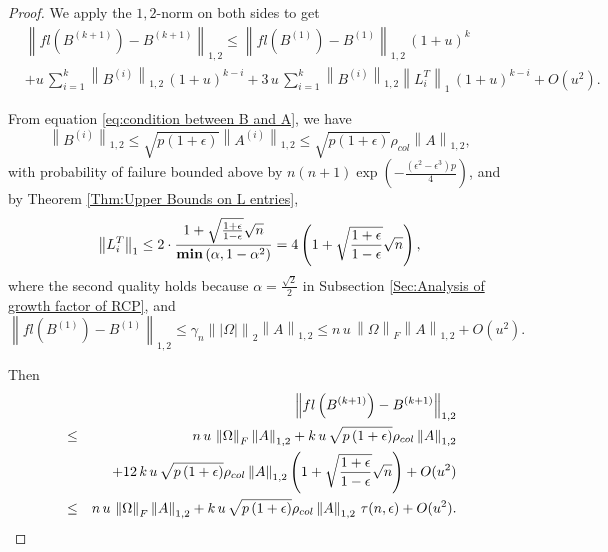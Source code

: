 \documentclass[11pt]{article}
\begin{document}
\begin{proof}
We apply the $1,2$-norm on both sides to get
\begin{align*}
    &\left\| fl\left(B^{(k+1)}\right)  - B^{(k+1)} \right\|_{1,2} \le \left\| fl \left(B^{(1)} \right)  - B^{(1)} \right\|_{1,2} \, (1+u)^{k} \\
& + u \, \sum_{i=1}^{k} \left\| B^{(i)} \right\|_{1,2} \, (1+u)^{k-i} + 3 \, u \, \sum_{i = 1}^{k} \left\| B^{(i)} \right\|_{1,2} \left\| L_i^T \right\|_1 \, (1+u)^{k-i} + O(u^2).
\end{align*}

From equation \eqref{eq:condition between B and A}, we have 
\begin{equation*}
\left\|B^{(i)}\right\|_{1,2} \le \sqrt{p(1+\epsilon)} \left\|A^{(i)}\right\|_{1,2} \le \sqrt{p(1+\epsilon)}
\rho_{col}\left\|A\right\|_{1,2},
\end{equation*}
with probability of failure bounded above by $n(n+1) \exp{\left( -\frac{(\epsilon^2-\epsilon^3) p}{4} \right)}$, and by Theorem \ref{Thm:Upper Bounds on L entries},
\begin{equation*}
\left\|L_i^T\right\|_1 \le 2 \cdot \frac{1+\sqrt{\frac{1+\epsilon}{1-\epsilon}}\sqrt{n}}{{\bf min}\left(\alpha, 1-\alpha^2\right)} = 4 \left( 1+\sqrt{\frac{1+\epsilon}{1-\epsilon}}\sqrt{n} \right),
\end{equation*}
where the second quality holds because $\alpha = \frac{\sqrt{2}}{2}$ in Subsection \ref{Sec:Analysis of growth factor of RCP}, and
\begin{equation*}
\left\|fl\left(B^{(1)}\right)-B^{(1)}\right\|_{1,2} 
\le \gamma_n \left\|\left|\Omega\right|\right\|_2 \left\|A\right\|_{1,2} \le n \, u \, \left\|\Omega\right\|_F \left\|A\right\|_{1,2} + O(u^2).
\end{equation*}

Then 
\begin{eqnarray}\label{eq:1,2 norm of B(k+1) error}
&&\left\|fl\left(B^{(k+1)}\right)-B^{(k+1)}\right\|_{1,2} \notag \\
&\le&n \, u \, \left\|\Omega\right\|_F \left\|A\right\|_{1,2}  + 
k \, u \, \sqrt{p\left(1+\epsilon\right)} \rho_{col} \left\|A\right\|_{1,2} \notag \\
&&+ 12 \, k \, u \, \sqrt{p\left(1+\epsilon\right)} \rho_{col} \left\|A\right\|_{1,2} \left( 1+\sqrt{\frac{1+\epsilon}{1-\epsilon}}\sqrt{n} \right) + O(u^2) \notag \\
& \le & n \, u \, \left\|\Omega\right\|_F \left\|A\right\|_{1,2} + 
k \, u \, \sqrt{p\left(1+\epsilon\right)} \rho_{col} \left\|A\right\|_{1,2} \, \tau(n, \epsilon) + O(u^2).
\end{eqnarray}


\end{proof}
\end{document}
